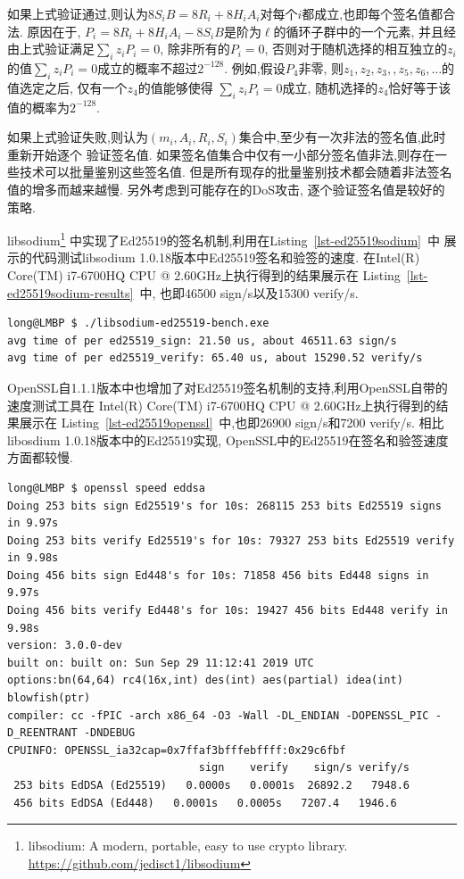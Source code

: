 如果上式验证通过,则认为$8S_iB = 8R_i + 8H_iA_i$对每个$i$都成立,也即每个签名值都合法.
原因在于, $P_i = 8R_i + 8H_iA_i - 8S_iB$是阶为$\ell$的循环子群中的一个元素,
并且经由上式验证满足$\sum_i z_iP_i = 0$, 除非所有的$P_i = 0$, 
否则对于随机选择的相互独立的$z_i$的值$\sum_i z_iP_i = 0$成立的概率不超过$2^{-128}$.
例如,假设$P_4$非零, 则$z_1, z_2, z_3, , z_5, z_6, \ldots$的值选定之后, 仅有一个$z_4$的值能够使得
$\sum_i z_iP_i = 0$成立, 随机选择的$z_4$恰好等于该值的概率为$2^{-128}$.

如果上式验证失败,则认为$(m_i, A_i, R_i, S_i)$集合中,至少有一次非法的签名值,此时重新开始逐个
验证签名值. 如果签名值集合中仅有一小部分签名值非法,则存在一些技术可以批量鉴别这些签名值.
但是所有现存的批量鉴别技术都会随着非法签名值的增多而越来越慢. 另外考虑到可能存在的DoS攻击,
逐个验证签名值是较好的策略.

libsodium\footnote{libsodium: A modern, portable, easy to use crypto library.
\url{https://github.com/jedisct1/libsodium}}
中实现了Ed25519的签名机制,利用在Listing~\ref{lst-ed25519sodium}~中
展示的代码测试libsodium 1.0.18版本中Ed25519签名和验签的速度.
在Intel(R) Core(TM) i7-6700HQ CPU @ 2.60GHz上执行得到的结果展示在
Listing~\ref{lst-ed25519sodium-results}~中, 也即46500 sign/s以及15300 verify/s.



\begin{lstlisting}[caption=Ed25519 Speed in libsodium, label=lst-ed25519sodium-results]
long@LMBP $ ./libsodium-ed25519-bench.exe
avg time of per ed25519_sign: 21.50 us, about 46511.63 sign/s
avg time of per ed25519_verify: 65.40 us, about 15290.52 verify/s
\end{lstlisting}

OpenSSL自1.1.1版本中也增加了对Ed25519签名机制的支持,利用OpenSSL自带的速度测试工具在
Intel(R) Core(TM) i7-6700HQ CPU @ 2.60GHz上执行得到的结果展示在
Listing~\ref{lst-ed25519openssl}~中,也即26900 sign/s和7200 verify/s.
相比libosdium 1.0.18版本中的Ed25519实现, OpenSSL中的Ed25519在签名和验签速度方面都较慢.

\begin{lstlisting}[caption=Ed25519 Speed in OpenSSL, label=lst-ed25519openssl]
long@LMBP $ openssl speed eddsa
Doing 253 bits sign Ed25519's for 10s: 268115 253 bits Ed25519 signs in 9.97s
Doing 253 bits verify Ed25519's for 10s: 79327 253 bits Ed25519 verify in 9.98s
Doing 456 bits sign Ed448's for 10s: 71858 456 bits Ed448 signs in 9.97s
Doing 456 bits verify Ed448's for 10s: 19427 456 bits Ed448 verify in 9.98s
version: 3.0.0-dev
built on: built on: Sun Sep 29 11:12:41 2019 UTC
options:bn(64,64) rc4(16x,int) des(int) aes(partial) idea(int) blowfish(ptr)
compiler: cc -fPIC -arch x86_64 -O3 -Wall -DL_ENDIAN -DOPENSSL_PIC -D_REENTRANT -DNDEBUG
CPUINFO: OPENSSL_ia32cap=0x7ffaf3bfffebffff:0x29c6fbf
                              sign    verify    sign/s verify/s
 253 bits EdDSA (Ed25519)   0.0000s   0.0001s  26892.2   7948.6
 456 bits EdDSA (Ed448)   0.0001s   0.0005s   7207.4   1946.6
\end{lstlisting}

